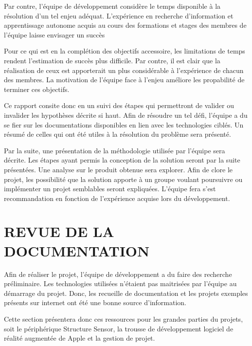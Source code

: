 \documentclass[letterpaper,twoside,12pt,french]{report}
\begin{document}
Par contre, l'équipe de développement considère le temps disponible à la résolution d'un tel enjeu
adéquat. L'expérience en recherche d'information et apprentissage autonome acquis au cours des
formations et stages des membres de l'équipe laisse envisager un succès
\par
Pour ce qui est en la complétion des objectifs accessoire, les limitations de temps rendent
l'estimation de succès plus difficile. Par contre, il est clair que la réalisation de ceux est
apporterait un plus considérable à l'expérience de chacun des membres. La motivation de l'équipe
face à l'enjeu améliore les propabilité de terminer ces objectifs.
\par
Ce rapport consite donc en un suivi des étapes qui permettront de valider ou invalider les
hypothèses décrite si haut. Afin de résoudre un tel défi, l'équipe a du se fier sur les
documentations disponibles en lien avec les technologies ciblés. Un résumé de celles qui ont été
utiles à la résolution du problème sera présenté.
\par
Par la suite, une présentation de la méthodologie utilisée par l'équipe sera décrite. Les étapes
ayant permis la conception de la solution seront par la suite présentées. Une analyse sur le produit
obtenue sera explorer. Afin de clore le projet, les possibilité que la solution apporte à un groupe voulant poursuivre ou
implémenter un projet semblables seront expliquées. L'équipe fera s'est recommandation en fonction
de l'expérience acquise lors du développement.
\chapter*{\uppercase{Revue de la documentation}}
Afin de réaliser le projet, l'équipe de développement a du faire des recherche préliminaire. Les
technologies utilisées n'étaient pas maitrisées par l'équipe au démarrage du projet. Donc, les
recueille de documentation et les projets exemples présents sur internet ont été une bonne source
d'information.
\par
Cette section présentera donc ces ressources pour les grandes parties du projets,
soit le périphérique Structure Sensor, la trousse de développement logiciel de réalité augmentée de
Apple et la gestion de projet.
\end{document}
